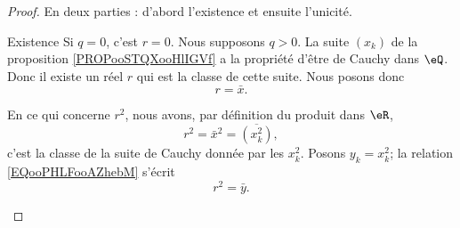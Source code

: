 \begin{proof}
    En deux parties : d'abord l'existence et ensuite l'unicité.
    \begin{subproof}
        \item[Existence]
            Si \( q=0\), c'est \( r=0\). Nous supposons \( q>0\). La suite \( (x_k)\) de la proposition \ref{PROPooSTQXooHlIGVf} a la propriété d'être de Cauchy dans \( \eQ\). Donc il existe un réel \( r\) qui est la classe de cette suite. Nous posons donc
            \begin{equation}
                r=\bar x.
            \end{equation}
            
            En ce qui concerne \( r^2\), nous avons, par définition du produit dans \( \eR\),    
            \begin{equation}        \label{EQooPHLFooAZhebM}
                r^2=\bar x^2=\overline{ (x_k^2) },
            \end{equation}
            c'est la classe de la suite de Cauchy donnée par les \( x_k^2\). Posons \( y_k=x_k^2\); la relation \eqref{EQooPHLFooAZhebM} s'écrit
            \begin{equation}
                r^2=\bar y.
            \end{equation}
            

\end{subproof}
\end{proof}
